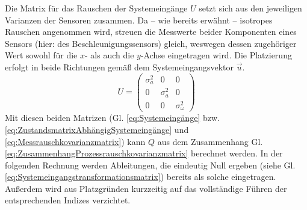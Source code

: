\documentclass[12pt,a4paper]{article}
\begin{document}
	Die Matrix für das Rauschen der Systemeingänge $U$ setzt sich aus den jeweiligen Varianzen der Sensoren zusammen. Da -- wie bereits erwähnt -- isotropes Rauschen angenommen wird, streuen die Messwerte beider Komponenten eines Sensors (hier: des Beschleunigungssensors) gleich, weswegen dessen zugehöriger Wert sowohl für die $x$- als auch die $y$-Achse eingetragen wird. Die Platzierung erfolgt in beide Richtungen gemäß dem Systemeingangsvektor $\vec{u}$.
	\begin{equation}\label{eq:Messrauschkovarianzmatrix}U=
		\begin{pmatrix}
		\sigma_{a}^{2} & 0 & 0 \\
		0 & \sigma_{a}^{2} & 0 \\
		0 & 0 & \sigma_{\omega}^{2}
		\end{pmatrix}		
	\end{equation}
	Mit diesen beiden Matrizen (Gl. \ref{eq:Systemeingänge} bzw. \ref{eq:ZustandsmatrixAbhängigSystemeingänge} und \ref{eq:Messrauschkovarianzmatrix}) kann $Q$ aus dem Zusammenhang Gl. \ref{eq:ZusammenhangProzessrauschkovarianzmatrix} berechnet werden. In der folgenden Rechnung werden Ableitungen, die eindeutig Null ergeben (siehe Gl. \ref{eq:Systemeingangstransformationsmatrix}) bereits als solche eingetragen. Außerdem wird aus Platzgründen kurzzeitig auf das vollständige Führen der entsprechenden Indizes verzichtet.\\
\end{document}
